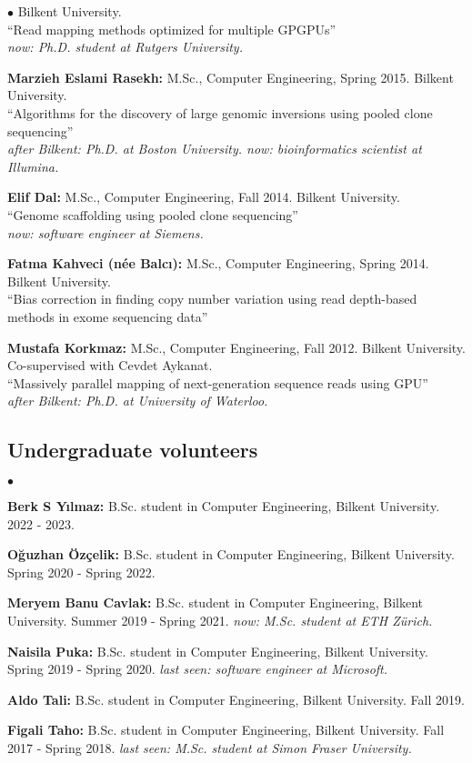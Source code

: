 \documentclass[margin,line]{res}
\newenvironment{list2}{
  \begin{list}{$\bullet$}{%
      \setlength{\itemsep}{0.1cm}
      \setlength{\parsep}{0in} \setlength{\parskip}{0in}
      \setlength{\topsep}{0in} \setlength{\partopsep}{0in} 
      \setlength{\leftmargin}{0.2in}}}{\end{list}}
\begin{document}
\begin{resume}
\begin{list2}
  Bilkent University.\\
  ``Read mapping methods optimized for multiple GPGPUs''\\
  {\it now: Ph.D. student at Rutgers University.}
\item
  {\bf Marzieh Eslami Rasekh:} M.Sc., Computer Engineering, Spring 2015.
  Bilkent University.\\
  ``Algorithms for the discovery of large genomic inversions using pooled clone sequencing''\\
  {\it after Bilkent: Ph.D. at Boston University. now: bioinformatics scientist at Illumina.}
\item
  {\bf Elif Dal:} M.Sc., Computer Engineering, Fall 2014.
  Bilkent University.\\
  ``Genome scaffolding using pooled clone sequencing''\\
  {\it now: software engineer at Siemens.}

\item
  {\bf Fatma Kahveci (n\'{e}e Balc{\i}):} M.Sc., Computer Engineering, Spring 2014.
  Bilkent University.\\
  ``Bias correction in finding copy number variation using read depth-based methods in exome sequencing data''
\item
 {\bf Mustafa Korkmaz:} M.Sc., Computer Engineering, Fall 2012.
  Bilkent University. \\ Co-supervised with Cevdet Aykanat.\\
  ``Massively parallel mapping of next-generation sequence reads using GPU''\\
  {\it after Bilkent: Ph.D. at University of Waterloo.}
\end{list2}
\vspace*{-.4cm}
\subsection{\small \sc Undergraduate volunteers}
\begin{list2}
\item {\bf Berk S Yılmaz:} B.Sc. student in Computer Engineering,  Bilkent University. 2022 - 2023.
\item {\bf Oğuzhan Özçelik:} B.Sc. student in Computer Engineering,  Bilkent University. Spring 2020 - Spring 2022.
\item {\bf Meryem Banu Cavlak:} B.Sc. student in Computer Engineering,  Bilkent University. Summer 2019 - Spring 2021. {\it now: M.Sc. student at ETH Zürich.}
\item {\bf Naisila Puka:} B.Sc. student in Computer Engineering,  Bilkent University. Spring 2019 - Spring 2020. {\it last seen: software engineer at Microsoft.}
  \item {\bf Aldo Tali:} B.Sc. student in Computer Engineering,  Bilkent University. Fall 2019.
\item {\bf Figali Taho:} B.Sc. student in Computer Engineering,  Bilkent University. Fall 2017 - Spring 2018. {\it last seen: M.Sc. student at Simon Fraser University.}


\end{list2}
\end{resume}
\end{document}
